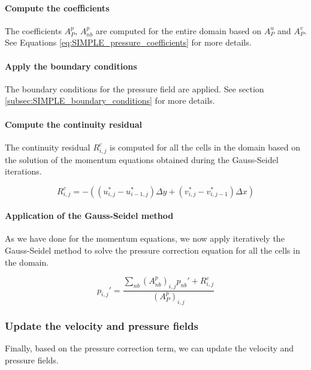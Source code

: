 \paragraph{Compute the coefficients}

The coefficients $A_P^p$, $A_{nb}^p$ are computed for the entire domain based on $A_P^u$ and $A_P^v$. See Equations \ref{eq:SIMPLE_pressure_coefficients} for more details.

\paragraph{Apply the boundary conditions}

The boundary conditions for the pressure field are applied. See section \ref{subsec:SIMPLE_boundary_conditions} for more details.

\paragraph{Compute the continuity residual}

The continuity residual $R^c_{i,j}$ is computed for all the cells in the domain based on the solution of the momentum equations obtained during the Gauss-Seidel iterations.

\begin{equation}
    R^c_{i,j} = -((u_{i,j}^* - u_{i-1,j}^*) \Delta y + (v_{i,j}^* - v_{i,j-1}^*) \Delta x)
\end{equation}

\paragraph{Application of the Gauss-Seidel method}

As we have done for the momentum equations, we now apply iteratively the Gauss-Seidel method to solve the pressure correction equation for all the cells in the domain.

\begin{equation}
    p_{i,j}' = \frac{\sum_{nb} (A_{nb}^p)_{i,j} p_{nb}' + R^c_{i,j}}{(A_P^p)_{i,j}}
\end{equation}


\subsubsection{Update the velocity and pressure fields}

Finally, based on the pressure correction term, we can update the velocity and pressure fields.

